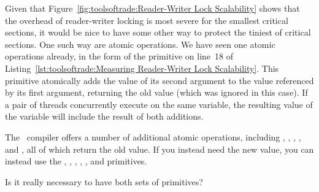 Given that
Figure~\ref{fig:toolsoftrade:Reader-Writer Lock Scalability}
shows that the overhead of reader-writer locking is most severe for the
smallest critical sections, it would be nice to have some other way
to protect the tiniest of critical sections.
One such way are atomic operations.
We have seen one atomic operations already, in the form of the
 primitive on line~18 of
Listing~\ref{lst:toolsoftrade:Measuring Reader-Writer Lock Scalability}.
This primitive atomically adds the value of its second argument to
the value referenced by its first argument, returning the old value
(which was ignored in this case).
If a pair of threads concurrently execute  on
the same variable, the resulting value of the variable will include
the result of both additions.

The \GNUC\ compiler offers a number of additional atomic operations,
including ,
,
,
, and
, all of which return the old value.
If you instead need the new value, you can instead use the
,
,
,
,
, and
 primitives.

\QuickQuiz{}
	Is it really necessary to have both sets of primitives?
 \QuickQuizEnd

